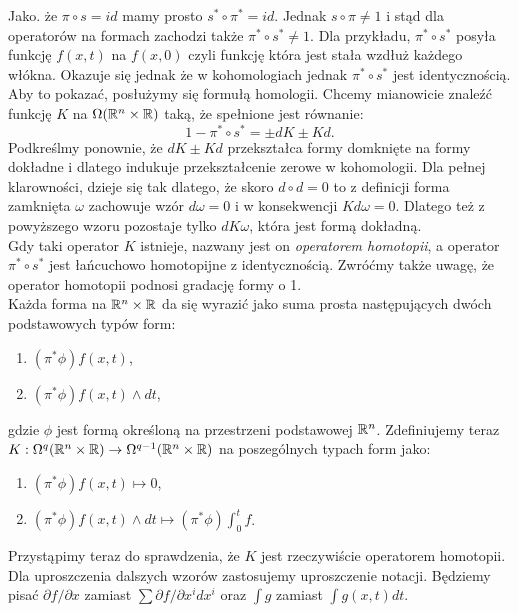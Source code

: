 \documentclass[licencjacka]{pracamgr}
\theoremstyle{definition}
\theoremstyle{definition}
\theoremstyle{plain}
\theoremstyle{plain}
\theoremstyle{plain}
\theoremstyle{plain}
\def\R{\ensuremath\mathbb{R}}
\begin{document}
Jako. że $\pi \circ s = id$  mamy prosto $s^\ast \circ \pi^\ast = id$. Jednak
$s \circ \pi \neq 1$ i stąd dla operatorów
na formach zachodzi także $\pi^\ast \circ s^\ast \neq 1$. Dla przykładu,
$\pi^\ast \circ s^\ast$ posyła funkcję $f(x, t)$ na $f(x, 0)$ czyli 
funkcję która jest stała wzdłuż każdego włókna. Okazuje się jednak
że w kohomologiach jednak $\pi^\ast \circ s^\ast$ jest identycznością.
Aby to pokazać, posłużymy się formułą homologii. Chcemy mianowicie
znaleźć funkcję $K$ na $\Omega(\R^n \times \R)$ taką, że spełnione jest
równanie:
\[
    1 - \pi^\ast \circ s^\ast = \pm dK \pm Kd.
\]
Podkreślmy ponownie, że $dK \pm Kd$ przekształca formy domknięte
na formy dokładne i dlatego indukuje przekształcenie zerowe w kohomologii. 
Dla pełnej klarowności, dzieje się tak dlatego, że skoro $d \circ d = 0$
to z definicji forma zamknięta $\omega$ zachowuje wzór $d \omega = 0$ i
w konsekwencji $K d \omega = 0$. Dlatego też z powyższego wzoru pozostaje
tylko $d K \omega$, która jest formą dokładną. \\

Gdy taki operator $K$ istnieje, nazwany jest on \emph{operatorem homotopii},
a operator $\pi^\ast \circ s^\ast$ jest łańcuchowo homotopijne z identycznością.
Zwróćmy także uwagę, że operator homotopii podnosi gradację formy o 1. \\

Każda forma na $\R^n \times \R$ da się wyrazić jako suma prosta następujących
dwóch podstawowych typów form:

\begin{enumerate}
    \item $(\pi^\ast \phi)f(x,t)$, 
    \item $(\pi^\ast \phi)f(x,t) \wedge dt$,
\end{enumerate}

gdzie $\phi$ jest formą określoną na przestrzeni podstawowej $\R^n$.
Zdefiniujemy teraz
$K: \Omega^{q} (\R^n \times \R) \rightarrow \Omega^{q-1} (\R^n \times \R)$ 
na poszególnych typach form jako:
\begin{enumerate}
    \item $(\pi^\ast \phi)f(x,t) \mapsto 0$,
    \item $(\pi^\ast \phi)f(x,t) \wedge dt \mapsto (\pi^\ast \phi) \int_0^t f$.
\end{enumerate}
Przystąpimy teraz do sprawdzenia, że $K$ jest rzeczywiście operatorem homotopii.
Dla uproszczenia dalszych wzorów zastosujemy uproszczenie notacji. Będziemy
pisać $\partial f / \partial x$ zamiast $\sum \partial f / \partial x^i dx^i$
oraz $\int g$ zamiast $\int g(x, t) dt$. \\
\end{document}
